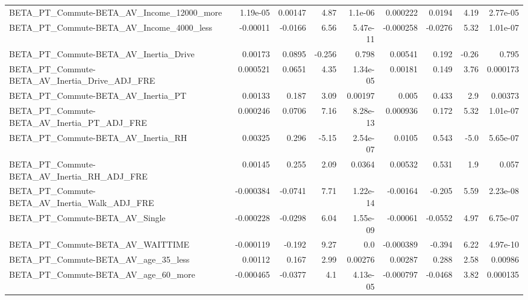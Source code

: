 \begin{tabular}{lrrrrrrrr}
BETA\_PT\_Commute-BETA\_AV\_Income\_12000\_more          &    1.19e-05 &      0.00147 &     4.87 &  1.1e-06 &   0.000222 &      0.0194 &         4.19 &      2.77e-05 \\
BETA\_PT\_Commute-BETA\_AV\_Income\_4000\_less           &    -0.00011 &      -0.0166 &     6.56 & 5.47e-11 &  -0.000258 &     -0.0276 &         5.32 &      1.01e-07 \\
BETA\_PT\_Commute-BETA\_AV\_Inertia\_Drive              &     0.00173 &       0.0895 &   -0.256 &    0.798 &    0.00541 &       0.192 &        -0.26 &         0.795 \\
BETA\_PT\_Commute-BETA\_AV\_Inertia\_Drive\_ADJ\_FRE      &    0.000521 &       0.0651 &     4.35 & 1.34e-05 &    0.00181 &       0.149 &         3.76 &      0.000173 \\
BETA\_PT\_Commute-BETA\_AV\_Inertia\_PT                 &     0.00133 &        0.187 &     3.09 &  0.00197 &      0.005 &       0.433 &          2.9 &       0.00373 \\
BETA\_PT\_Commute-BETA\_AV\_Inertia\_PT\_ADJ\_FRE         &    0.000246 &       0.0706 &     7.16 & 8.28e-13 &   0.000936 &       0.172 &         5.32 &      1.01e-07 \\
BETA\_PT\_Commute-BETA\_AV\_Inertia\_RH                 &     0.00325 &        0.296 &    -5.15 & 2.54e-07 &     0.0105 &       0.543 &         -5.0 &      5.65e-07 \\
BETA\_PT\_Commute-BETA\_AV\_Inertia\_RH\_ADJ\_FRE         &     0.00145 &        0.255 &     2.09 &   0.0364 &    0.00532 &       0.531 &          1.9 &         0.057 \\
BETA\_PT\_Commute-BETA\_AV\_Inertia\_Walk\_ADJ\_FRE       &   -0.000384 &      -0.0741 &     7.71 & 1.22e-14 &   -0.00164 &      -0.205 &         5.59 &      2.23e-08 \\
BETA\_PT\_Commute-BETA\_AV\_Single                     &   -0.000228 &      -0.0298 &     6.04 & 1.55e-09 &   -0.00061 &     -0.0552 &         4.97 &      6.75e-07 \\
BETA\_PT\_Commute-BETA\_AV\_WAITTIME                   &   -0.000119 &       -0.192 &     9.27 &      0.0 &  -0.000389 &      -0.394 &         6.22 &      4.97e-10 \\
BETA\_PT\_Commute-BETA\_AV\_age\_35\_less                &     0.00112 &        0.167 &     2.99 &  0.00276 &    0.00287 &       0.288 &         2.58 &       0.00986 \\
BETA\_PT\_Commute-BETA\_AV\_age\_60\_more                &   -0.000465 &      -0.0377 &      4.1 & 4.13e-05 &  -0.000797 &     -0.0468 &         3.82 &      0.000135 \\

\end{tabular}
